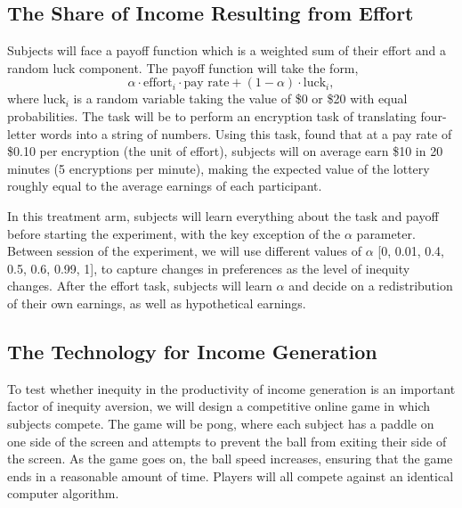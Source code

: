 \documentclass[12pt, a4paper]{article}
\begin{document}
\subsection*{The Share of Income Resulting from Effort}
Subjects will face a payoff function which is a weighted sum of their effort and a random luck component. The payoff function will take the form,
$$\alpha \cdot \text{effort}_i \cdot \text{pay rate} + (1-\alpha) \cdot \text{luck}_i,$$
where $\text{luck}_i$ is a random variable taking the value of \$0 or \$20 with equal probabilities. The task will be to perform an encryption task of translating four-letter words into a string of numbers. Using this task, \citet{Erkal_Gangadharan_Nikiforakis_AER2011} found that at a pay rate of \$0.10 per encryption (the unit of effort), subjects will on average earn \$10 in 20 minutes (5 encryptions per minute), making the expected value of the lottery roughly equal to the average earnings of each participant.
% 
% 
% 
%

In this treatment arm, subjects will learn everything about the task and payoff before starting the experiment, with the key exception of the $\alpha$ parameter. Between session of the experiment, we will use different values of $\alpha$ [0, 0.01, 0.4, 0.5, 0.6, 0.99, 1], to capture changes in preferences as the level of inequity changes. After the effort task, subjects will learn $\alpha$ and decide on a redistribution of their own earnings, as well as hypothetical earnings.

\subsection*{The Technology for Income Generation}

To test whether inequity in the productivity of income generation is an important factor of inequity aversion, we will design a competitive online game in which subjects compete. The game will be pong, where each subject has a paddle on one side of the screen and attempts to prevent the ball from exiting their side of the screen. As the game goes on, the ball speed increases, ensuring that the game ends in a reasonable amount of time. Players will all compete against an identical computer algorithm. 
\end{document}
